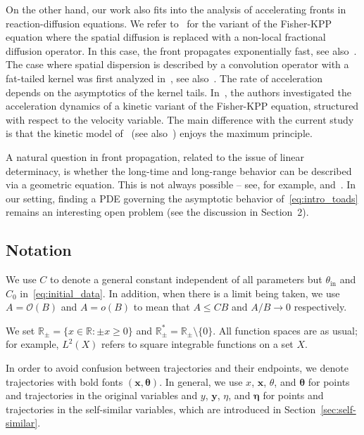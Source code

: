\documentclass[10pt]{amsart}
\theoremstyle{definition}\newtheorem{defi}[theo]{Definition}\newtheorem{rema}[theo]{Remark}\newtheorem{exam}[theo]{Example}\newtheorem{exem}[theo]{Example}\newtheorem{nota}[theo]{Notation}
\newcommand{\rmin}{\mathrm{in}}
\newcommand{\R}{\mathbb{R}}
\newcommand{\bx}{\mathbf{x}}
\newcommand{\by}{\mathbf{y}}
\newcommand{\mO}{\mathcal{O}}
\newcommand{\btheta}{\boldsymbol{\theta}}
\newcommand{\beeta}{\boldsymbol{\eta}}
\newcommand{\1}{\mathds{1}}
\newcommand*{\MK}{\mkern 2mu}
\begin{document}
On the other hand, our work also fits into the analysis of accelerating fronts in reaction-diffusion equations. We refer to~\cite{CoulonRoquejoffre,CabreRoquejoffre} for the variant of the Fisher-KPP equation where the spatial diffusion is replaced with a non-local fractional diffusion operator. In this case, the front propagates exponentially fast, see also~\cite{mirrahimi_singular_2018,meleard_singular_2015}. The case where spatial dispersion is described by a convolution operator with a fat-tailed kernel was first analyzed in~\cite{Garnier}, see also~\cite{bouin_thin_2018}. The rate of acceleration depends on the asymptotics of the kernel tails. In~\cite{BouinCalvezNadin,bouin_large_2016}, the authors investigated the acceleration dynamics of a kinetic variant of the Fisher-KPP equation, structured with respect to the velocity variable. The main difference with the current study is that the kinetic model of~\cite{BouinCalvezNadin} (see also~\cite{cuesta_traveling_2012}) enjoys the maximum principle.


A natural question in front propagation, related to the issue of linear determinacy, is whether the long-time and long-range behavior can be described via a geometric equation. This is not always possible -- see, for example, \cite[Chapter~6.2]{Freidlin1} and~\cite[examples~B$\MK$(i) and B$\MK$(ii)]{MajdaSouganidis}. In our setting, finding a PDE governing the asymptotic behavior of~\eqref{eq:intro_toads} remains an interesting open problem (see the discussion in Section~2).



\subsection*{Notation}
We use $C$ to denote a general constant independent of all parameters but $\theta_{\rmin}$ and $C_0$ in~\eqref{eq:initial_data}. In addition, when there is a limit being taken, we use $A = \mO(B)$ and $A = o(B)$ to mean that $A \leq C B$ and $A/B \to 0$ respectively.

We set $\R_\pm = \{x \in \R : \pm x \geq 0\}$ and $\R_\pm^* = \R_\pm \setminus\{0\}$. All function spaces are as usual; for example, $L^2(X)$ refers to square integrable functions on a set $X$.

In order to avoid confusion between trajectories and their endpoints, we denote trajectories with bold fonts $(\bx,\btheta)$. In general, we use $x$, $\bx$, $\theta$, and $\btheta$ for points and trajectories in the original variables and $y$, $\by$, $\eta$, and $\beeta$ for points and trajectories in the self-similar variables, which are introduced in Section~\ref{sec:self-similar}.
\end{document}
